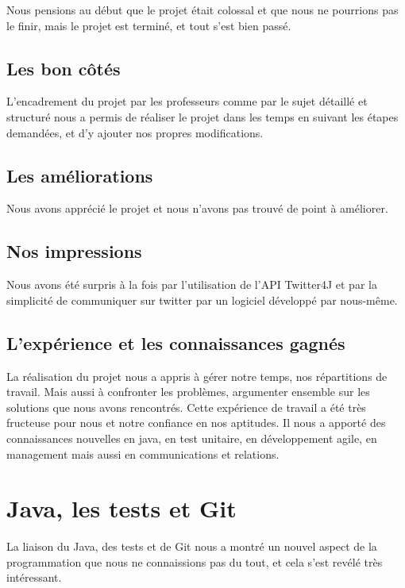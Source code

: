 \documentclass[12pt]{article}
\begin{document}
Nous pensions au début que le projet était colossal et que nous ne pourrions pas le finir, mais le projet est terminé, et tout s'est bien passé.

\subsection{Les bon côtés}
L'encadrement du projet par les professeurs comme par le sujet détaillé et structuré nous a permis de réaliser le projet dans les temps en suivant les étapes demandées, et d'y ajouter nos propres modifications.\\

\subsection{Les améliorations}
Nous avons apprécié le projet et nous n'avons pas trouvé de point à améliorer.\\

\subsection{Nos impressions}
Nous avons été surpris à la fois par l'utilisation de l'API Twitter4J et par la simplicité de communiquer sur twitter par un logiciel développé par nous-même.\\

\subsection{L'expérience et les connaissances gagnés}
La réalisation du projet nous a appris à gérer notre temps, nos répartitions de travail. Mais aussi à confronter les problèmes, argumenter ensemble sur les solutions que nous avons rencontrés. Cette expérience de travail a été très fructeuse pour nous et notre confiance en nos aptitudes. Il nous a apporté des connaissances nouvelles en java, en test unitaire, en développement agile, en management mais aussi en communications et relations.

\newpage
\section{Java, les tests et Git}

La liaison du Java, des tests et de Git nous a montré un nouvel aspect de la programmation que nous ne connaissions pas du tout, et cela s'est revélé très intéressant.
\end{document}

